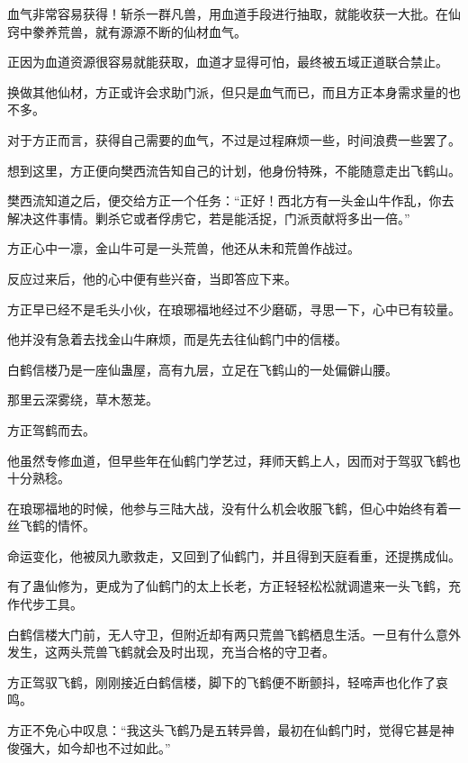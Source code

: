 
\begin{this_body}



血气非常容易获得！斩杀一群凡兽，用血道手段进行抽取，就能收获一大批。在仙窍中豢养荒兽，就有源源不断的仙材血气。

正因为血道资源很容易就能获取，血道才显得可怕，最终被五域正道联合禁止。

换做其他仙材，方正或许会求助门派，但只是血气而已，而且方正本身需求量的也不多。

对于方正而言，获得自己需要的血气，不过是过程麻烦一些，时间浪费一些罢了。

想到这里，方正便向樊西流告知自己的计划，他身份特殊，不能随意走出飞鹤山。

樊西流知道之后，便交给方正一个任务：“正好！西北方有一头金山牛作乱，你去解决这件事情。剿杀它或者俘虏它，若是能活捉，门派贡献将多出一倍。”

方正心中一凛，金山牛可是一头荒兽，他还从未和荒兽作战过。

反应过来后，他的心中便有些兴奋，当即答应下来。

方正早已经不是毛头小伙，在琅琊福地经过不少磨砺，寻思一下，心中已有较量。

他并没有急着去找金山牛麻烦，而是先去往仙鹤门中的信楼。

白鹤信楼乃是一座仙蛊屋，高有九层，立足在飞鹤山的一处偏僻山腰。

那里云深雾绕，草木葱茏。

方正驾鹤而去。

他虽然专修血道，但早些年在仙鹤门学艺过，拜师天鹤上人，因而对于驾驭飞鹤也十分熟稔。

在琅琊福地的时候，他参与三陆大战，没有什么机会收服飞鹤，但心中始终有着一丝飞鹤的情怀。

命运变化，他被凤九歌救走，又回到了仙鹤门，并且得到天庭看重，还提携成仙。

有了蛊仙修为，更成为了仙鹤门的太上长老，方正轻轻松松就调遣来一头飞鹤，充作代步工具。

白鹤信楼大门前，无人守卫，但附近却有两只荒兽飞鹤栖息生活。一旦有什么意外发生，这两头荒兽飞鹤就会及时出现，充当合格的守卫者。

方正驾驭飞鹤，刚刚接近白鹤信楼，脚下的飞鹤便不断颤抖，轻啼声也化作了哀鸣。

方正不免心中叹息：“我这头飞鹤乃是五转异兽，最初在仙鹤门时，觉得它甚是神俊强大，如今却也不过如此。”


\end{this_body}
